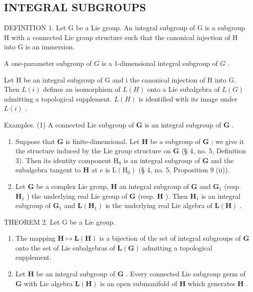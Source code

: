 \subsection{INTEGRAL SUBGROUPS}

DEFINITION 1. Let G be a Lie group. An integral subgroup of G is a subgroup H with a connected Lie group structure such that the canonical injection of H into G is an immersion.

A one-parameter subgroup of \(G\) is a 1-dimensional integral subgroup of \(G\) .

Let H be an integral subgroup of G and i the canonical injection of H into G. Then \(L(i)\) defines an isomorphism of \(L(H)\) onto a Lie subalgebra of \(L(G)\) admitting a topological supplement. \(L(H)\) is identified with its image under \(L(i)\) .

Examples. (1) A connected Lie subgroup of \(\mathbf{G}\) is an integral subgroup of \(\mathbf{G}\) .

\begin{enumerate}
\def\labelenumi{(\arabic{enumi})}
\setcounter{enumi}{1}
\item
  Suppose that \(\mathbf{G}\) is finite-dimensional. Let \(\mathbf{H}\) be a subgroup of \(\mathbf{G}\) ; we give it the structure induced by the Lie group structure on \(\mathbf{G}\) (§ 4, no. 5, Definition 3). Then its identity component \(\mathrm{H}_0\) is an integral subgroup of \(\mathbf{G}\) and the subalgebra tangent to \(\mathbf{H}\) at \(e\) is \(\mathrm{L}(\mathrm{H}_0)\) (§ 4, no. 5, Proposition 9 (ii)).
\item
  Let \(\mathbf{G}\) be a complex Lie group, \(\mathbf{H}\) an integral subgroup of \(\mathbf{G}\) and \(\mathbf{G}_1\) (resp. \(\mathbf{H}_1\) ) the underlying real Lie group of \(\mathbf{G}\) (resp. \(\mathbf{H}\) ). Then \(\mathbf{H}_1\) is an integral subgroup of \(\mathbf{G}_1\) and \(\mathbf{L}(\mathbf{H}_1)\) is the underlying real Lie algebra of \(\mathbf{L}(\mathbf{H})\) .
\end{enumerate}

THEOREM 2. Let G be a Lie group.

\begin{enumerate}
\def\labelenumi{(\roman{enumi})}
\item
  The mapping \(\mathbf{H} \mapsto \mathbf{L}(\mathbf{H})\) is a bijection of the set of integral subgroups of \(\mathbf{G}\) onto the set of Lie subalgebras of \(\mathbf{L}(\mathbf{G})\) admitting a topological supplement.
\item
  Let \(\mathbf{H}\) be an integral subgroup of \(\mathbf{G}\) . Every connected Lie subgroup germ of \(\mathbf{G}\) with Lie algebra \(\mathbf{L}(\mathbf{H})\) is an open submanifold of \(\mathbf{H}\) which generates \(\mathbf{H}\) .
\end{enumerate}


